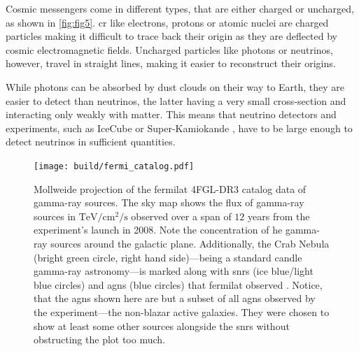 Cosmic messengers come in different types, that are either charged or uncharged, as shown in \autoref{fig:fig5}.
\gls{cr} like electrons, protons or atomic nuclei are charged particles making it difficult to trace back their origin
as they are deflected by cosmic electromagnetic fields. Uncharged particles like photons or
neutrinos, however, travel in straight lines, making it easier to reconstruct their origins.

While photons can be absorbed by dust clouds on their way to Earth, they are easier to detect than
neutrinos, the latter having a very small cross-section and interacting only weakly with matter.
This means that neutrino detectors and experiments, such as IceCube \cite{icecube_2006} or
Super-Kamiokande \cite{kamiokande}, have to be large enough to detect neutrinos in sufficient quantities.

\begin{figure}
    \centering
    \texttt{[image: build/fermi\_catalog.pdf]}
    \caption{Mollweide projection of the \gls{fermilat} 4FGL-DR3 catalog data of gamma-ray sources. The sky map
    shows the flux of gamma-ray sources in \(\si{\tera\eV\per\centi\meter\squared\per\second}\)
    observed over a span of \(\num{12}\) years from the experiment's launch in 2008. Note the
    concentration of \gls{he} gamma-ray sources around the galactic plane. Additionally,
    the Crab Nebula (bright green circle, right hand side)---being a standard candle gamma-ray astronomy---is marked
    along with \glspl{snr} (ice blue/light blue circles) and \glspl{agn} (blue circles) that \gls{fermilat}
    observed \cite{fermi4fgl, fermi4fgldr3}. Notice, that the \glspl{agn} shown here are but a subset
    of all \glspl{agn} observed by the experiment---the non-blazar active galaxies. They were chosen
    to show at least some other sources alongside the \glspl{snr} without obstructing the plot too much.}
    \label{fig:LAT}
\end{figure}

